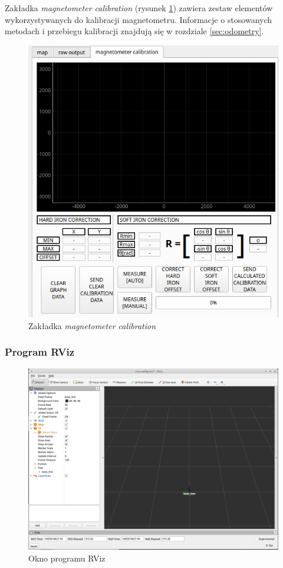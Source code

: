 Zakładka \emph{magnetometer calibration} (rysunek \ref{fig:main-app-mag-section}) zawiera zestaw elementów wykorzystywanych do kalibracji magnetometru. Informacje o stosowanych metodach i przebiegu kalibracji znajdują się w rozdziale \ref{sec:odometry}.
\begin{figure}[ht]
	\centering
		\includegraphics[width=0.8\linewidth]{rys/main-app-view-magnetom.PNG}
	\caption{Zakładka \emph{magnetometer calibration}}
	\label{fig:main-app-mag-section}
\end{figure}


\subsubsection{Program RViz}
\begin{figure}[ht]
	\centering
		\includegraphics[width=1\linewidth]{rys/main-app-view-4.PNG}
	\caption{Okno programu RViz}
	\label{fig:rviz-window}
\end{figure}

